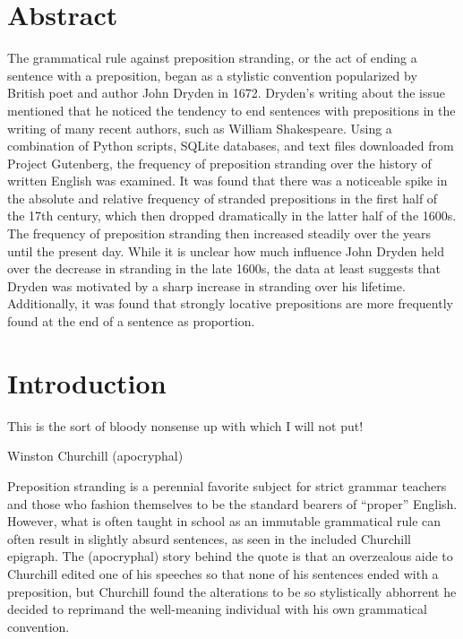 \documentclass[DIV=calc, paper=letter, fontsize=12pt]{scrartcl}	 %
\begin{document}
\begin{multicols}{2} %

\section{Abstract}

\noindent The grammatical rule against preposition stranding, or the act of ending a sentence with a preposition, began as a stylistic convention popularized by British poet and author John Dryden in 1672. Dryden's writing about the issue mentioned that he noticed the tendency to end sentences with prepositions in the writing of many recent authors, such as William Shakespeare. Using a combination of Python scripts, SQLite databases, and text files downloaded from Project Gutenberg, the frequency of preposition stranding over the history of written English was examined. It was found that there was a noticeable spike in the absolute and relative frequency of stranded prepositions in the first half of the 17th century, which then dropped dramatically in the latter half of the 1600s. The frequency of preposition stranding then increased steadily over the years until the present day. While it is unclear how much influence John Dryden held over the decrease in stranding in the late 1600s, the data at least suggests that Dryden was motivated by a sharp increase in stranding over his lifetime. Additionally, it was found that strongly locative prepositions are more frequently found at the end of a sentence as proportion.



\section{Introduction}

\epigraph{This is the sort of bloody nonsense up with which I will not put!}{Winston Churchill (apocryphal)}

Preposition stranding is a perennial favorite subject for strict grammar teachers and those who 
fashion themselves to be the standard bearers of ``proper'' English. However, what is often taught
in school as an immutable grammatical rule can often result in slightly absurd sentences, as seen
in the included Churchill epigraph. The (apocryphal) story behind the quote is that an overzealous 
aide to Churchill edited one of his speeches so that none of his sentences ended with a preposition,
but Churchill found the alterations to be so stylistically abhorrent he decided to reprimand the 
well-meaning individual with his own grammatical convention\cite{Churchill}. 


\end{multicols}
\end{document}
